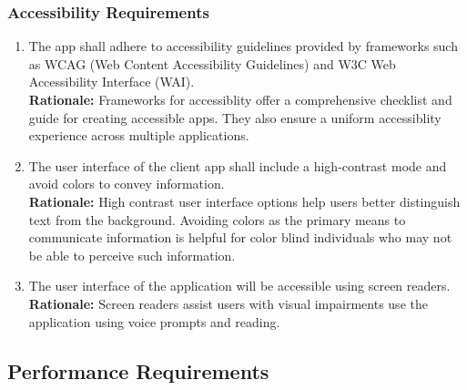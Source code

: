 \documentclass[]{article}
\begin{document}
\subsubsection{Accessibility Requirements}
\label{ssub:accessibility_requirements}
\begin{enumerate}[{UH-A}1. ]
	\item The app shall adhere to accessibility guidelines provided by frameworks such as WCAG (Web Content Accessibility Guidelines) and W3C Web Accessibility Interface (WAI).\\
	\textbf{Rationale:} Frameworks for accessiblity offer a comprehensive checklist and guide for creating accessible apps. They also ensure a uniform accessiblity experience across multiple applications.
	\item The user interface of the client app shall include a high-contrast mode and avoid colors to convey information.\\
	\textbf{Rationale:} High contrast user interface options help users better distinguish text from the background. Avoiding colors as the primary means to communicate information is helpful for color blind individuals
	who may not be able to perceive such information.
	\item The user interface of the application will be accessible using screen readers.\\
	\textbf{Rationale:} Screen readers assist users with visual impairments use the application using voice prompts and reading.
\end{enumerate}


\subsection{Performance Requirements}
\label{sub:performance_requirements}
\end{document}
